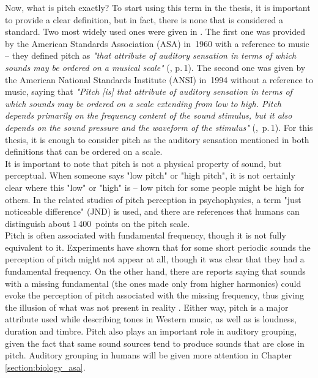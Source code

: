 Now, what is pitch exactly? To start using this term in the thesis, it is important to provide a clear definition, but in fact, there is none that is considered a standard. Two most widely used ones were given in \cite{Plack2005}. The first one was provided by the American Standards Association (ASA) in~1960 with a reference to music -- they defined pitch as \textit{"that attribute of auditory sensation in terms of which sounds may be ordered on a musical scale"} (\cite{Plack2005}, p.\,1). The second one was given by the American National Standards Institute (ANSI) in~1994 without a reference to music, saying that \textit{"Pitch [is] that attribute of auditory sensation in terms of which sounds may be ordered on a scale extending from low to high. Pitch depends primarily on the frequency content of the sound stimulus, but it also depends on the sound pressure and the waveform of the stimulus"} (\cite{Plack2005},~p.\,1). For this thesis, it is enough to consider pitch as the auditory sensation mentioned in both definitions that can be ordered on a scale.\\

It is important to note that pitch is not a physical property of sound, but perceptual. When someone says "low pitch" or "high pitch", it is not certainly clear where this "low" or "high" is -- low pitch for some people might be high for others. In the related studies of pitch perception in psychophysics, a term "just noticeable difference" (JND) is used, and there are references that humans can distinguish about 1\,400~points on the pitch scale.\\

Pitch is often associated with fundamental frequency, though it is not fully equivalent to it. Experiments have shown that for some short periodic sounds the perception of pitch might not appear at all, though it was clear that they had a fundamental frequency. On the other hand, there are reports saying that sounds with a missing fundamental (the ones made only from higher harmonics) could evoke the perception of pitch associated with the missing frequency, thus giving the illusion of what was not present in reality \cite{Schnupp2011}. Either way, pitch is a major attribute used while describing tones in Western music, as well as is loudness, duration and timbre. Pitch also plays an important role in auditory grouping, given the fact that same sound sources tend to produce sounds that are close in pitch. Auditory grouping in humans will be given more attention in Chapter \ref{section:biology_asa}.




